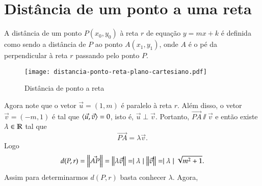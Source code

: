 \section{Dist\^ancia de um ponto a uma reta} %
\label{sec:distancia_de_um_ponto_a_uma_reta}
A dist\^ancia de um ponto $P(x_0,y_0)$ \`a reta $r$ de equa\c{c}\~ao $y = mx + k$ \'e definida como sendo a dist\^ancia de $P$ ao ponto $A(x_1, y_1)$, onde $A$ \'e o p\'e da perpendicular \`a reta $r$ passando pelo ponto $P$.
\begin{figure}[!h]
  \centering
  \caption{Dist\^ancia de ponto a reta}
  \texttt{[image: distancia-ponto-reta-plano-cartesiano.pdf]}


\end{figure}
Agora note que o vetor $\vec{u} = (1,m)$ \'e paralelo \`a reta $r$. Al\'em disso, o vetor $\vec{v} = (-m, 1)$ \'e tal que $\langle \vec{u}, \vec{v} \rangle = 0$, isto \'e, $\vec{u}\perp\vec{v}$. Portanto, $\vec{PA}\varparallel\vec{v}$ e ent\~ao existe $\lambda \in \mathbb{R}$ tal que
\[
  \vec{PA} = \lambda\vec{v}.
\]
Logo
\begin{equation}\label{distancia_ponto_reta_plano}
  d(P,r) = \left\Vert{\vec{AP}}\right\Vert = \left\Vert{\lambda\vec{v}}\right\Vert = \mid\lambda\mid \left\Vert{\vec{v}}\right\Vert = \mid\lambda\mid\sqrt{m^2 + 1}.
\end{equation}
Assim para determinarmos $d(P,r)$ basta conhecer $\lambda$. Agora,
